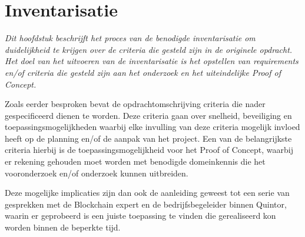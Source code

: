 \chapter{Inventarisatie}

\textit{Dit hoofdstuk beschrijft het proces van de benodigde inventarisatie om duidelijkheid te krijgen over de criteria die gesteld zijn in de originele opdracht. Het doel van het uitvoeren van de inventarisatie is het opstellen van requirements en/of criteria die gesteld zijn aan het onderzoek en het uiteindelijke Proof of Concept.}

Zoals eerder besproken bevat de opdrachtomschrijving criteria die nader gespecificeerd dienen te worden. Deze criteria gaan over snelheid, beveiliging en toepassingsmogelijkheden waarbij elke invulling van deze criteria mogelijk invloed heeft op de planning en/of de aanpak van het project. Een van de belangrijkste criteria hierbij is de toepassingsmogelijkheid voor het Proof of Concept, waarbij er rekening gehouden moet worden met benodigde domeinkennis die het vooronderzoek en/of onderzoek kunnen uitbreiden.

Deze mogelijke implicaties zijn dan ook de aanleiding geweest tot een serie van gesprekken met de Blockchain expert en de bedrijfsbegeleider binnen Quintor, waarin er geprobeerd is een juiste toepassing te vinden die gerealiseerd kon worden binnen de beperkte tijd.

